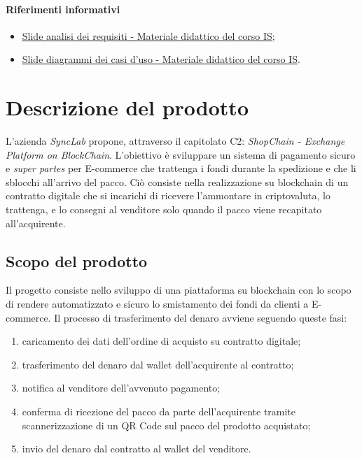 \documentclass[a4paper, 12pt]{article}
\begin{document}
\paragraph{Riferimenti informativi}
\begin{itemize}
    \item \underline{\href{https://www.math.unipd.it/~tullio/IS-1/2021/Dispense/T07.pdf}{Slide analisi dei requisiti - Materiale didattico del corso IS}};
    \item \underline{\href{https://www.math.unipd.it/~rcardin/swea/2022/Diagrammi\%20Use\%20Case.pdf}{Slide diagrammi dei casi d'uso - Materiale didattico del corso IS}}.
\end{itemize}

\section{Descrizione del prodotto}
L'azienda \textit{SyncLab} propone, attraverso il capitolato C2: \textit{ShopChain - Exchange Platform on
BlockChain}. L'obiettivo è sviluppare un sistema di pagamento sicuro e \textit{super partes} per E-commerce che trattenga i fondi durante la spedizione e che li sblocchi all'arrivo del pacco. Ciò consiste nella realizzazione su blockchain di un contratto digitale che si incarichi di ricevere l’ammontare in criptovaluta, lo trattenga, e lo consegni al venditore solo quando il pacco viene recapitato all’acquirente.
\subsection{Scopo del prodotto}
Il progetto consiste nello sviluppo di una piattaforma su blockchain con lo scopo di rendere automatizzato e sicuro lo smistamento dei fondi da clienti a E-commerce. Il processo di trasferimento del denaro avviene seguendo queste fasi:
\begin{enumerate}
\item caricamento dei dati dell'ordine di acquisto su contratto digitale;
\item trasferimento del denaro dal wallet dell'acquirente al contratto;
\item notifica al venditore dell'avvenuto pagamento;
\item conferma di ricezione del pacco da parte dell'acquirente tramite scannerizzazione di un QR Code sul pacco del prodotto acquistato;
\item invio del denaro dal contratto al wallet del venditore.
\end{enumerate}
\end{document}
